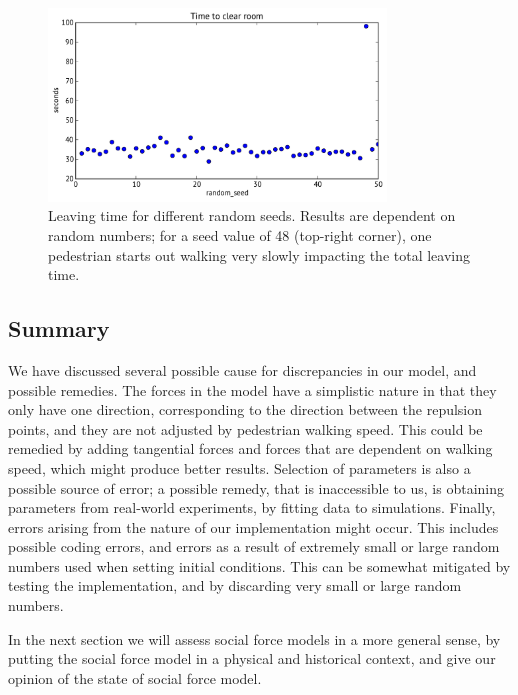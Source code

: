 \begin{figure}[h]
    \centering
    \includegraphics[width=0.8\textwidth]{Figures/random-seed-variations.pdf}
    \caption[Leaving time for different random seeds]{Leaving time for 
    different random seeds. Results are dependent on random numbers; for a 
    seed value of 48 (top-right corner), one pedestrian starts out walking 
    very slowly impacting the total leaving time.}
    \label{fig:random-seed}
\end{figure}


\subsection{Summary}
We have discussed several possible cause for discrepancies in our model, and possible 
remedies. The forces in the model have a simplistic nature in that they only 
have one direction, corresponding to the direction between the repulsion 
points, and they are not adjusted by pedestrian walking speed. This could be 
remedied by adding tangential forces and forces that are dependent on walking 
speed, which might produce better results. Selection of parameters is also a 
possible source of error; a possible remedy, that is inaccessible to us, is 
obtaining parameters from real-world experiments, by fitting data to 
simulations. Finally, errors arising from the nature of our implementation 
might occur. This includes possible coding errors, and errors as a result of 
extremely small or large random numbers used when setting initial conditions. 
This can be somewhat mitigated by testing the implementation, and by 
discarding very small or large random numbers.

In the next section we will assess social force models in a more general sense, 
by putting the social force model in a physical and historical context, and give 
our opinion of the state of social force model.
